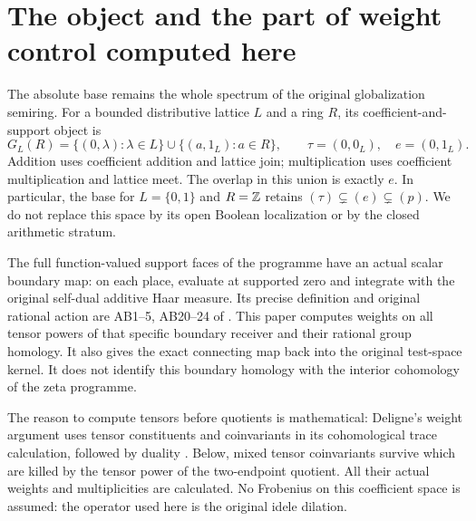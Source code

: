 

\section{The object and the part of weight control computed here}
The absolute base remains the whole spectrum of the original globalization
semiring. For a bounded distributive lattice $L$ and a ring $R$, its
coefficient-and-support object is
\[
 G_L(R)=\{(0,\lambda):\lambda\in L\}\cup\{(a,1_L):a\in R\},
 \qquad \tau=(0,0_L),\quad e=(0,1_L).
 \tag{BW1}
\]
Addition uses coefficient addition and lattice join; multiplication uses
coefficient multiplication and lattice meet. The overlap in this union is
exactly $e$. In particular, the base for $L=\{0,1\}$ and $R=\mathbb Z$ retains
$(\tau)\subsetneq(e)\subsetneq(p)$. We do not replace this space by its
open Boolean localization or by the closed arithmetic stratum.

The full function-valued support faces of the programme have an actual
scalar boundary map: on each place, evaluate at supported zero and
integrate with the original self-dual additive Haar measure. Its precise
definition and original rational action are AB1--5, AB20--24 of
\cite{BWBoundarySource}. This paper computes weights on all tensor powers of that
specific boundary receiver and their rational group homology. It also
gives the exact connecting map back into the original test-space kernel.
It does not identify this boundary homology with the interior cohomology
of the zeta programme.

The reason to compute tensors before quotients is mathematical:
Deligne's weight argument uses tensor constituents and coinvariants in
its cohomological trace calculation, followed by duality
\cite[1.3.13, 1.4.1--1.5.3, 1.8.4, 3.3.1--3.3.6]{DeligneII}.
Below, mixed tensor coinvariants survive which are killed by the
tensor power of the two-endpoint quotient. All their actual weights
and multiplicities are calculated. No Frobenius on this coefficient
space is assumed: the operator used here is the original idele dilation.

